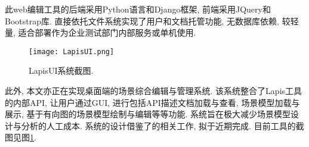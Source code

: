         此web编辑工具的后端采用Python语言和Django框架, 前端采用JQuery和Bootstrap库. 直接依托文件系统实现了用户和文档托管功能, 无数据库依赖, 较轻量, 适合部署作为企业测试部门内部服务或单机使用.
    
        \begin{figure}
            \centering
            \texttt{[image: LapisUI.png]}
            \caption[LapisUI系统截图]{LapisUI系统截图.}
            \label{fig:lapis_ui_screenshot}
        \end{figure}
    
        \label{sec:scenario_gui_edit}
        此外, 本文亦正在实现桌面端的场景综合编辑与管理系统. 该系统整合了Lapis工具的内部API, 让用户通过GUI, 进行包括API描述文档加载与查看, 场景模型加载与展示, 基于有向图的场景模型绘制与编辑等等功能. 系统旨在极大减少场景模型设计与分析的人工成本. 系统的设计借鉴了的相关工作, 拟于近期完成. 目前工具的截图见图\ref{fig:lapis_ui_screenshot}.
        


